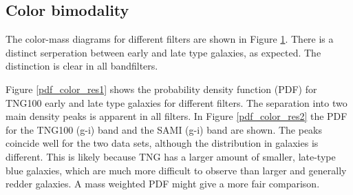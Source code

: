 \subsection{Color bimodality}
The color-mass diagrams for different filters are shown in Figure \ref{color_magnitude_res}. There is a distinct serperation between early and late type galaxies, as expected. The distinction is clear in all bandfilters. 

Figure \ref{pdf_color_res1} shows the probability density function (PDF) for TNG100 early and late type galaxies for different filters. The separation into two main density peaks is apparent in all filters. In Figure \ref{pdf_color_res2} the PDF for the TNG100 (g-i) band and the SAMI (g-i) band are shown. The peaks coincide well for the two data sets, although the distribution in galaxies is different. This is likely because TNG has a larger amount of smaller, late-type blue galaxies, which are much more difficult to observe than larger and generally redder galaxies. A mass weighted PDF might give a more fair comparison.

\begin{figure}
    \centering
    \caption{}
    \label{color_magnitude_res}
\end{figure}

